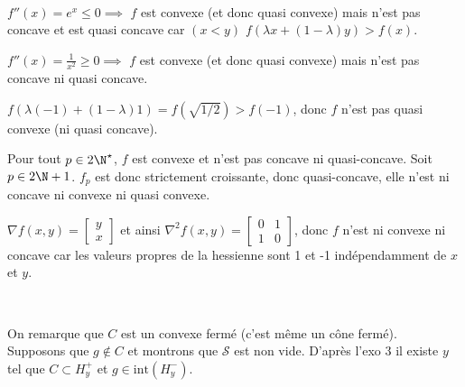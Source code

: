 \documentclass[12pt,a4paper]{article}
\begin{document}
	\begin{sol}
		$ $\\
			\begin{enumerate}
				\begin{minipage}{17cm}
				\item $f''(x) = e^x \leq 0 \implies$ $f$ est convexe (et donc quasi convexe) mais n'est pas concave et est quasi concave car $(x < y)$ $f(\lambda x + (1-\lambda)y) > f(x) $.
				\item $f''(x) = \frac1{x^2} \geq 0 \implies$ $f$ est convexe (et donc quasi convexe) mais n'est pas concave ni quasi concave.
				\item $f(\lambda (-1) + (1-\lambda)1) = f(\sqrt{1/2}) > f(-1)$, donc $f$ n'est pas quasi convexe (ni quasi concave).
				\end{minipage}
				\newpage
				\begin{minipage}{17cm}
				\item Pour tout $p \in 2\N^\star$, $f$ est convexe et n'est pas concave ni quasi-concave. Soit $p \in 2\N+1$. $f_p$ est donc strictement croissante, donc quasi-concave, elle n'est ni concave ni convexe ni quasi convexe.
				\item 
				\item $\nabla f(x,y) = \begin{bmatrix}
					y\\
					x
				\end{bmatrix}$ et ainsi $\nabla^2 f(x,y) = \begin{bmatrix}
				0 & 1 \\
				1 & 0
				\end{bmatrix}$, donc $f$ n'est ni convexe ni concave car les valeurs propres de la hessienne sont 1 et -1 indépendamment de $x$ et $y$.
				\end{minipage}
			\end{enumerate}
	\end{sol}
	
	\begin{sol}
		$ $\\
		
		\begin{minipage}{17cm}
			On remarque que $C$ est un convexe fermé (c'est même un cône fermé).\\
			Supposons que $g \not\in C$ et montrons que $\mathcal{S}$ est non vide.
			D'après l'exo 3 il existe $y$ tel que $C \subset H_y^+$ et $g \in \mathrm{int}(H_y^-)$. 
		\end{minipage} 
	\end{sol}
\end{document}
